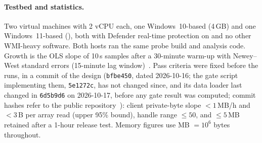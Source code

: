 \documentclass[letterpaper,twocolumn,10pt]{article}
\newcommand{\code}[1]{\texttt{\small #1}}
\begin{document}
\paragraph{Testbed and statistics.}
Two virtual machines with 2 vCPU each, one Windows~10-based (4\,GB) and one Windows~11-based (\WbRAM{}), both with Defender real-time protection on and no other WMI-heavy software.
Both hosts ran the same probe build and analysis code.
Growth is the OLS slope of 10\,s samples after a 30-minute warm-up with Newey--West standard errors (15-minute lag window)~\cite{newey-west}.
Pass criteria were fixed before the runs, in a commit of the design (\code{bfbe450}, dated 2026-10-16; the gate script implementing them, \code{5e1272c}, has not changed since, and its data loader last changed in \code{6d5b9d6} on 2026-10-17, before any gate result was computed; commit hashes refer to the public repository~\cite{repo}): client private-byte slope $<1$\,MB/h and $<3$\,B per array read (upper 95\% bound), handle range $\le 50$, and $\le 5$\,MB retained after a 1-hour release test.
Memory figures use MB $=10^6$ bytes throughout.
\end{document}
